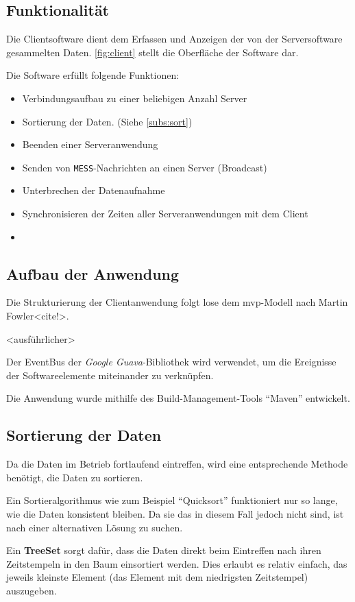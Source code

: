 \subsection{Funktionalität}
Die Clientsoftware dient dem Erfassen und Anzeigen der von der Serversoftware
gesammelten Daten. \autoref{fig:client} stellt die Oberfläche der Software dar.

Die Software erfüllt folgende Funktionen:
\begin{itemize}
  \item Verbindungsaufbau zu einer beliebigen Anzahl Server
  \item Sortierung der Daten. (Siehe \autoref{subs:sort})
  \item Beenden einer Serveranwendung
  \item Senden von \texttt{MESS}-Nachrichten an einen Server (Broadcast)
  \item Unterbrechen der Datenaufnahme
  \item Synchronisieren der Zeiten aller Serveranwendungen mit dem Client
  \item <weitere Funktionen> 
\end{itemize}
\subsection{Aufbau der Anwendung}
Die Strukturierung der Clientanwendung folgt lose dem \gls{mvp}-Modell nach
Martin Fowler<cite!>.

<ausführlicher>

Der EventBus der \emph{Google Guava}-Bibliothek wird verwendet, um die
Ereignisse der Softwareelemente miteinander zu verknüpfen.

Die Anwendung wurde mithilfe des Build-Management-Tools "`Maven"'
entwickelt.
\subsection{Sortierung der Daten}\label{subs:sort}
Da die Daten im Betrieb fortlaufend eintreffen, wird eine entsprechende Methode
benötigt, die Daten zu sortieren.

Ein Sortieralgorithmus wie zum Beispiel "`Quicksort"' funktioniert nur so lange,
wie die Daten konsistent bleiben. Da sie das in diesem Fall jedoch nicht sind,
ist nach einer alternativen Lösung zu suchen.

Ein \textbf{TreeSet} sorgt dafür, dass die Daten direkt beim Eintreffen nach
ihren Zeitstempeln in den Baum einsortiert werden. Dies erlaubt es relativ
einfach, das jeweils kleinste Element (das Element mit dem niedrigsten
Zeitstempel) auszugeben. 

